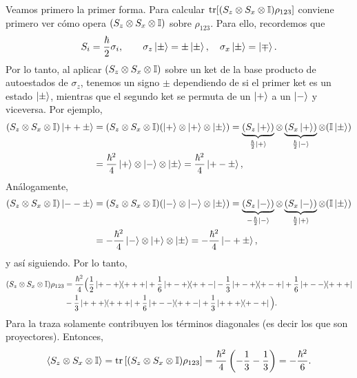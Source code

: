 \documentclass[10pt, a4paper]{article}
\numberwithin{equation}{subsection}
\begin{document}
Veamos primero la primer forma. Para calcular $\tr[(S_z \otimes S_x \otimes
\mathbb{I}) \rho_{123}]$ conviene primero ver cómo opera $(S_z \otimes S_x \otimes
\mathbb{I})$ sobre $\rho_{123}$. Para ello, recordemos que
\begin{equation}
  S_i = \frac{\hbar}{2}\sigma_i, \qquad \sigma_z\ket{\pm} = \pm\ket{\pm}, \quad
  \sigma_x\ket{\pm} = \ket{\mp}.
\end{equation}
Por lo tanto, al aplicar $(S_z \otimes S_x \otimes \mathbb{I})$ sobre un ket de la
base producto de autoestados de $\sigma_z$, tenemos un signo $\pm$ dependiendo
de si el primer ket es un estado $\ket{\pm}$, mientras que el segundo ket se
permuta de un $\ket{+}$ a un $\ket{-}$ y viceversa. Por ejemplo,
\begin{align}
  (S_z \otimes S_x \otimes \mathbb{I})\ket{++\pm}
  &= (S_z \otimes S_x \otimes \mathbb{I})(\ket{+}\otimes\ket{+}\otimes\ket{\pm})
  = \underbrace{(S_z \ket{+})}_{\frac{\hbar}{2}\ket{+}} \otimes
    \underbrace{(S_x\ket{+})}_{\frac{\hbar}{2}\ket{-}} \otimes
    (\mathbb{I}\ket{\pm}) \nonumber \\
  &= \frac{\hbar^2}{4}\ket{+}\otimes\ket{-}\otimes\ket{\pm}
  = \frac{\hbar^2}{4}\ket{+-\pm},
\end{align}
Análogamente,
\begin{align}
  (S_z \otimes S_x \otimes \mathbb{I})\ket{--\pm}
  &= (S_z \otimes S_x \otimes \mathbb{I})(\ket{-}\otimes\ket{-}\otimes\ket{\pm})
  = \underbrace{(S_z \ket{-})}_{-\frac{\hbar}{2}\ket{-}} \otimes
    \underbrace{(S_x\ket{-})}_{\frac{\hbar}{2}\ket{+}} \otimes
    (\mathbb{I}\ket{\pm}) \nonumber \\
  &= -\frac{\hbar^2}{4}\ket{-}\otimes\ket{+}\otimes\ket{\pm}
  = -\frac{\hbar^2}{4}\ket{-+\pm},
\end{align}
y así siguiendo. Por lo tanto,
\begin{align}
  (S_z \otimes S_x \otimes \mathbb{I})\rho_{123}
  &= \frac{\hbar^2}{4} \Big(
    \frac{1}{2}\ketbra{+-+}{+++} + \frac{1}{6}\ketbra{+-+}{++-} -
    \frac{1}{3}\ketbra{+-+}{+-+} + \frac{1}{6}\ketbra{+--}{+++}
    \nonumber \\
  &- \frac{1}{3}\ketbra{+++}{+++} + \frac{1}{6}\ketbra{+--}{++-} +
    \frac{1}{3}\ketbra{+++}{+-+} \Big).
\end{align}
Para la traza solamente contribuyen los términos diagonales (es decir los que
son proyectores). Entonces,
\begin{equation}
  \expval{S_z \otimes S_x \otimes\mathbb{I}}
  = \tr\left[(S_z \otimes S_x \otimes \mathbb{I})\rho_{123}\right]
  = \frac{\hbar^2}{4}\left( -\frac{1}{3} -\frac{1}{3}\right)
  = -\frac{\hbar^2}{6}.
\end{equation}
\end{document}
